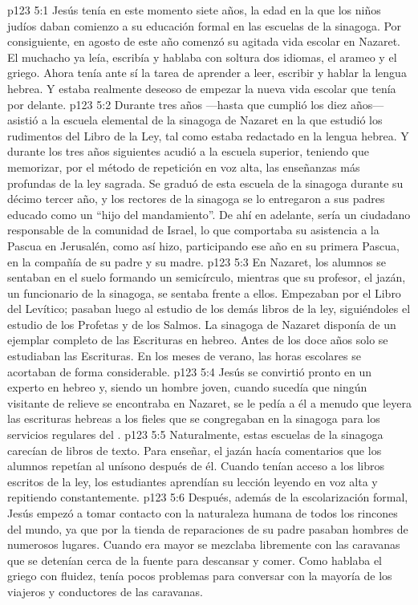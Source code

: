 \vs p123 5:1 Jesús tenía en este momento siete años, la edad en la que los niños judíos daban comienzo a su educación formal en las escuelas de la sinagoga. Por consiguiente, en agosto de este año comenzó su agitada vida escolar en Nazaret. El muchacho ya leía, escribía y hablaba con soltura dos idiomas, el arameo y el griego. Ahora tenía ante sí la tarea de aprender a leer, escribir y hablar la lengua hebrea. Y estaba realmente deseoso de empezar la nueva vida escolar que tenía por delante.
\vs p123 5:2 Durante tres años ---hasta que cumplió los diez años--- asistió a la escuela elemental de la sinagoga de Nazaret en la que estudió los rudimentos del Libro de la Ley, tal como estaba redactado en la lengua hebrea. Y durante los tres años siguientes acudió a la escuela superior, teniendo que memorizar, por el método de repetición en voz alta, las enseñanzas más profundas de la ley sagrada. Se graduó de esta escuela de la sinagoga durante su décimo tercer año, y los rectores de la sinagoga se lo entregaron a sus padres educado como un “hijo del mandamiento”. De ahí en adelante, sería un ciudadano responsable de la comunidad de Israel, lo que comportaba su asistencia a la Pascua en Jerusalén, como así hizo, participando ese año en su primera Pascua, en la compañía de su padre y su madre.
\vs p123 5:3 \pc En Nazaret, los alumnos se sentaban en el suelo formando un semicírculo, mientras que su profesor, el jazán, un funcionario de la sinagoga, se sentaba frente a ellos. Empezaban por el Libro del Levítico; pasaban luego al estudio de los demás libros de la ley, siguiéndoles el estudio de los Profetas y de los Salmos. La sinagoga de Nazaret disponía de un ejemplar completo de las Escrituras en hebreo. Antes de los doce años solo se estudiaban las Escrituras. En los meses de verano, las horas escolares se acortaban de forma considerable.
\vs p123 5:4 Jesús se convirtió pronto en un experto en hebreo y, siendo un hombre joven, cuando sucedía que ningún visitante de relieve se encontraba en Nazaret, se le pedía a él a menudo que leyera las escrituras hebreas a los fieles que se congregaban en la sinagoga para los servicios regulares del .
\vs p123 5:5 Naturalmente, estas escuelas de la sinagoga carecían de libros de texto. Para enseñar, el jazán hacía comentarios que los alumnos repetían al unísono después de él. Cuando tenían acceso a los libros escritos de la ley, los estudiantes aprendían su lección leyendo en voz alta y repitiendo constantemente.
\vs p123 5:6 \pc Después, además de la escolarización formal, Jesús empezó a tomar contacto con la naturaleza humana de todos los rincones del mundo, ya que por la tienda de reparaciones de su padre pasaban hombres de numerosos lugares. Cuando era mayor se mezclaba libremente con las caravanas que se detenían cerca de la fuente para descansar y comer. Como hablaba el griego con fluidez, tenía pocos problemas para conversar con la mayoría de los viajeros y conductores de las caravanas.

